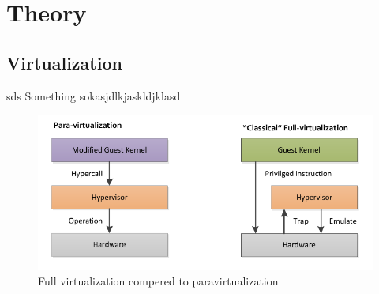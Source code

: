 \section{Theory}

\subsection{Virtualization} 
\label{theory:virtualization}
   sds
Something sokasjdlkjaskldjklasd

\begin{figure}[htbp]
    \centering
    \includegraphics[width=\textwidth]{Images/Virtualization_-_Para_vs_Full.png}
    \caption{Full virtualization compered to paravirtualization}

    \label{fig:vir-para-vs-full}
\end{figure}

